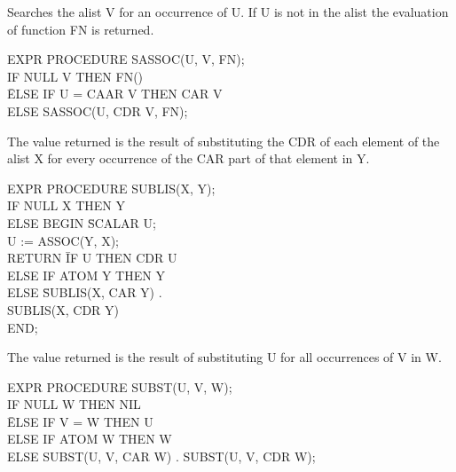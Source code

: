 {Searches the alist V for an occurrence of U. If U is not in the alist
the evaluation of function FN is returned. 

{\tt \begin{tabbing} EXPR PROCEDURE SASSOC(U, V, FN); \\
\hspace*{1em} IF NULL V THEN FN() \\
\hspace*{2em} \= ELSE IF U = CAAR V THEN CAR V \\
\> ELSE SASSOC(U, CDR V, FN);
\end{tabbing}}}

{The value returned is the result of substituting the CDR of each
element of the alist X for every occurrence of the CAR part of that
element in Y. 

{\tt \begin{tabbing} EXPR PROCEDURE SUBLIS(X, Y); \\
\hspace*{1em}IF NULL X THEN Y \\
\hspace*{2em} ELSE BEGIN \= SCALAR U; \\
\> U := ASSOC(Y, X); \\
\> RETURN \= IF U THEN CDR U \\
\> \> ELSE IF ATOM Y THEN Y \\
\> \> ELSE \= SUBLIS(X, CAR Y) . \\
\> \> \> SUBLIS(X, CDR Y) \\
\> END;
\end{tabbing}}}

{The value returned is the result of substituting U for all
occurrences of V in W. 

{\tt \begin{tabbing} EXPR PROCEDURE SUBST(U, V, W); \\
\hspace*{1em} IF NULL W THEN NIL \\
\hspace*{2em} \= ELSE IF V = W THEN U \\
\> ELSE IF ATOM W THEN W \\
\> ELSE SUBST(U, V, CAR W) . SUBST(U, V, CDR W);
\end{tabbing}}}


